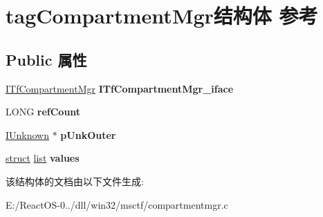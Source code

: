 \hypertarget{structtag_compartment_mgr}{}\section{tag\+Compartment\+Mgr结构体 参考}
\label{structtag_compartment_mgr}
\subsection*{Public 属性}
\begin{DoxyCompactItemize}
\item 
\mbox{\label{structtag_compartment_mgr_a8c927e5fd1da46c9a667f418fc3bad6c}} 
\hyperlink{interface_i_tf_compartment_mgr}{I\+Tf\+Compartment\+Mgr} {\bfseries I\+Tf\+Compartment\+Mgr\+\_\+iface}
\item 
\mbox{\label{structtag_compartment_mgr_ac283200669124399b71bae68cda0e06c}} 
L\+O\+NG {\bfseries ref\+Count}
\item 
\mbox{\label{structtag_compartment_mgr_a8be0a1c21054471cbe45bdba4237ac31}} 
\hyperlink{interface_i_unknown}{I\+Unknown} $\ast$ {\bfseries p\+Unk\+Outer}
\item 
\mbox{\label{structtag_compartment_mgr_a5fe360994808365ec0f56cd624b0c224}} 
\hyperlink{interfacestruct}{struct} \hyperlink{classlist}{list} {\bfseries values}
\end{DoxyCompactItemize}


该结构体的文档由以下文件生成\+:\begin{DoxyCompactItemize}
\item 
E\+:/\+React\+O\+S-\/0../dll/win32/msctf/compartmentmgr.\+c\end{DoxyCompactItemize}

